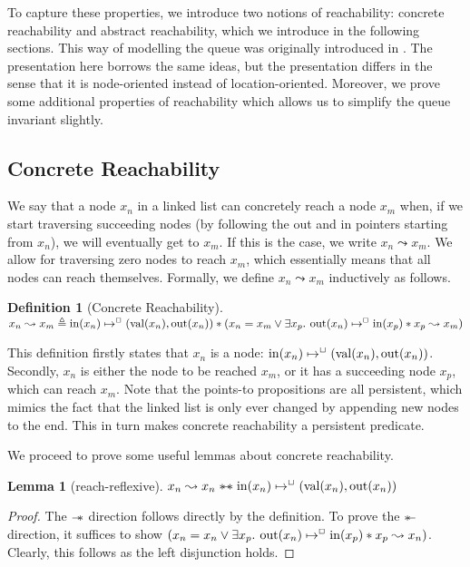 \documentclass[a4paper, 10pt]{report}
\theoremstyle{definition}
\newtheorem{lemma}[theorem]{Lemma}
\newtheorem{definition}{Definition}[section]
\newcommand{\nIn}[1]{\operatorname{in}(#1)}
\newcommand{\nVal}[1]{\operatorname{val}(#1)}
\newcommand{\nOut}[1]{\operatorname{out}(#1)}
\newcommand{\node}{x}
\newcommand{\nodeM}[1]{\node_{#1}}
\newcommand{\isNode}[1]{\nIn{#1} \mapsto^{\persistently} (\nVal{#1}, \nOut{#1})}
\newcommand{\reach}[2]{#1 \leadsto #2}
\begin{document}
To capture these properties, we introduce two notions of reachability: concrete reachability and abstract reachability, which we introduce in the following sections. This way of modelling the queue was originally introduced in \cite{DBLP:conf/cpp/VindumB21}. The presentation here borrows the same ideas, but the presentation differs in the sense that it is node-oriented instead of location-oriented. Moreover, we prove some additional properties of reachability which allows us to simplify the queue invariant slightly.

\subsection{Concrete Reachability}
We say that a node $\nodeM{n}$ in a linked list can concretely reach a node $\nodeM{m}$ when, if we start traversing succeeding nodes (by following the out and in pointers starting from $\nodeM{n}$), we will eventually get to $\nodeM{m}$. If this is the case, we write $\reach{\nodeM{n}}{\nodeM{m}}$. We allow for traversing zero nodes to reach $\nodeM{m}$, which essentially means that all nodes can reach themselves. Formally, we define $\reach{\nodeM{n}}{\nodeM{m}}$ inductively as follows.
\begin{definition}[Concrete Reachability]
  $\reach{\nodeM{n}}{\nodeM{m}} \eqdef \isNode{\nodeM{n}} \star (\nodeM{n} = \nodeM{m} \lor \Exists \nodeM{p} . \nOut{\nodeM{n}} \mapsto^{\persistently} \nIn{\nodeM{p}} \star \reach{\nodeM{p}}{\nodeM{m}})$
\end{definition}
This definition firstly states that $\nodeM{n}$ is a node: $\isNode{\nodeM{n}}$. Secondly, $\nodeM{n}$ is either the node to be reached $\nodeM{m}$, or it has a succeeding node $\nodeM{p}$, which can reach $\nodeM{m}$.
Note that the points-to propositions are all persistent, which mimics the fact that the linked list is only ever changed by appending new nodes to the end. This in turn makes concrete reachability a persistent predicate.

We proceed to prove some useful lemmas about concrete reachability.
\begin{lemma}[reach-reflexive]\label{lemma:reach-reflexive}
  $\reach{\nodeM{n}}{\nodeM{n}} \wandIff \isNode{\nodeM{n}}$
\end{lemma}
\begin{proof}
  The $\mathrel{-\!\!*}$ direction follows directly by the definition. To prove the $\mathrel{*\!\!-}$ direction, it suffices to show $(\nodeM{n} = \nodeM{n} \lor \Exists \nodeM{p} . \nOut{\nodeM{n}} \mapsto^{\persistently} \nIn{\nodeM{p}} \star \reach{\nodeM{p}}{\nodeM{n}})$. Clearly, this follows as the left disjunction holds.
\end{proof}
\end{document}
